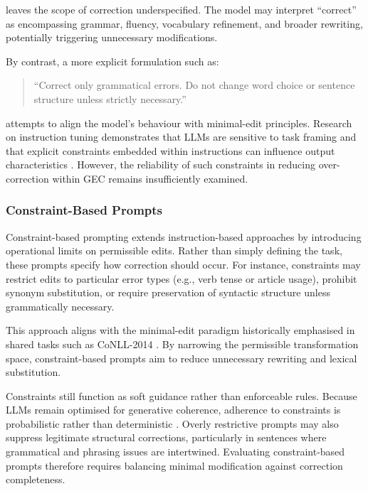 leaves the scope of correction underspecified. The model may interpret ``correct'' as encompassing grammar, fluency, vocabulary refinement, and broader rewriting, potentially triggering unnecessary modifications.

By contrast, a more explicit formulation such as:

\begin{quote}
``Correct only grammatical errors. Do not change word choice or sentence structure unless strictly necessary.''
\end{quote}

attempts to align the model's behaviour with minimal-edit principles. Research on instruction tuning demonstrates that LLMs are sensitive to task framing and that explicit constraints embedded within instructions can influence output characteristics \cite{wei2022finetuned,liu2023pretrain}. However, the reliability of such constraints in reducing over-correction within GEC remains insufficiently examined.

\subsubsection{Constraint-Based Prompts}

Constraint-based prompting extends instruction-based approaches by introducing operational limits on permissible edits. Rather than simply defining the task, these prompts specify how correction should occur. For instance, constraints may restrict edits to particular error types (e.g., verb tense or article usage), prohibit synonym substitution, or require preservation of syntactic structure unless grammatically necessary.

This approach aligns with the minimal-edit paradigm historically emphasised in shared tasks such as CoNLL-2014 \cite{ng-etal-2014-conll}. By narrowing the permissible transformation space, constraint-based prompts aim to reduce unnecessary rewriting and lexical substitution.

Constraints still function as soft guidance rather than enforceable rules. Because LLMs remain optimised for generative coherence, adherence to constraints is probabilistic rather than deterministic \cite{liu2023pretrain}. Overly restrictive prompts may also suppress legitimate structural corrections, particularly in sentences where grammatical and phrasing issues are intertwined. Evaluating constraint-based prompts therefore requires balancing minimal modification against correction completeness.

